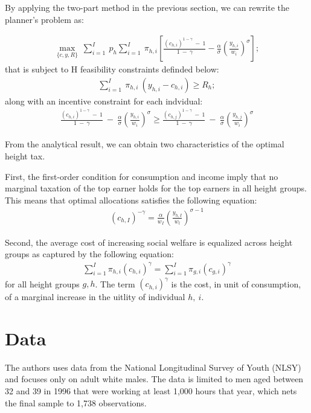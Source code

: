 \documentclass[titlepage]{\econtex}
\begin{document}
By applying the two-part method in the previous section, we can rewrite the planner's problem as:

\begin{align}
\max_{\{c,y,R\}} \ \sum_{i=1}^I \ p_{h} \sum_{i=1}^I \ \pi_{h,i} \left[ \frac{(c_{h,i})^{1-\gamma} \ - \ 1}{1 \ - \ \gamma} - \frac{\alpha}{\sigma} \left(\frac{y_{h,i}}{w_i}\right)^\sigma \right];
\end{align}  
that is subject to H feasibility constraints definded below:
\begin{align}
    \sum_{i=1}^I \ \pi_{h,i} \ (y_{h,i} - c_{h,i}) \geq R_h ;
 \end{align}
 along with an incentive constraint for each indvidual:
 \begin{align}
   \frac{(c_{h,i})^{1-\gamma} \ - \ 1}{1 \ - \ \gamma} \ - \  \frac{\alpha}{\sigma} \left(\frac{y_{h,i}}{w_i}\right)^\sigma \geq \frac{(c_{h,j})^{1-\gamma} \ - \ 1}{1 \ - \ \gamma} \ - \  \frac{\alpha}{\sigma} \left(\frac{y_{h,j}}{w_i}\right)^\sigma
\end{align}

From the analytical result, we can obtain two characteristics of the optimal height tax.

First, the first-order condition for consumption and income imply that no marginal taxation of the top earner holds for the top earners in all height groups. This means that optimal allocations satisfies the following equation:
\begin{align}
  (c_{h,I})^{- \gamma}= \frac{\alpha}{w_I}\left( \frac{y_{h,I}}{w_l}\right)^{\sigma - 1}
  \end{align}

  Second, the average cost of increasing social welfare is equalized across height groups as captured by the following equation:
\begin{align}
  \sum_{i=1}^I \pi_{h,i} (c_{h,i})^\gamma =  \sum_{i=1}^I \pi_{g,i} (c_{g,i})^\gamma
  \end{align}
  for all height groups $g,h$. The term $(c_{h,i})^\gamma$ is the cost, in unit of consumption, of a marginal increase in the uitlity of individual $h, \ i$.

\hypertarget{Data}{}
\section{Data}

The authors uses data from the National Longitudinal Survey of Youth (NLSY) and focuses only on adult white males. The data is limited to men aged between 32 and 39 in 1996 that were working at least 1,000 hours that year, which nets the final sample to 1,738 observations.
\end{document}
